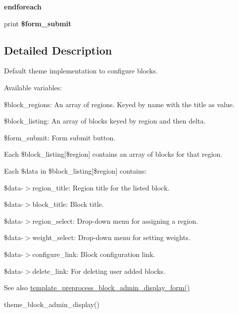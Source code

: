 \begin{DoxyCompactItemize}
\item 
\hypertarget{block-admin-display-form_8tpl_8php_a672d9707ef91db026c210f98cc601123}{
{\bfseries endforeach}}
\label{block-admin-display-form_8tpl_8php_a672d9707ef91db026c210f98cc601123}

\item 
\hypertarget{block-admin-display-form_8tpl_8php_a781a0b4540f3c04b33978b845353b2ab}{
print {\bfseries \$form\_\-submit}}
\label{block-admin-display-form_8tpl_8php_a781a0b4540f3c04b33978b845353b2ab}

\end{DoxyCompactItemize}


\subsection{Detailed Description}
Default theme implementation to configure blocks.

Available variables:
\begin{DoxyItemize}
\item \$block\_\-regions: An array of regions. Keyed by name with the title as value.
\item \$block\_\-listing: An array of blocks keyed by region and then delta.
\item \$form\_\-submit: Form submit button.
\end{DoxyItemize}

Each \$block\_\-listing\mbox{[}\$region\mbox{]} contains an array of blocks for that region.

Each \$data in \$block\_\-listing\mbox{[}\$region\mbox{]} contains:
\begin{DoxyItemize}
\item \$data-\/$>$region\_\-title: Region title for the listed block.
\item \$data-\/$>$block\_\-title: Block title.
\item \$data-\/$>$region\_\-select: Drop-\/down menu for assigning a region.
\item \$data-\/$>$weight\_\-select: Drop-\/down menu for setting weights.
\item \$data-\/$>$configure\_\-link: Block configuration link.
\item \$data-\/$>$delete\_\-link: For deleting user added blocks.
\end{DoxyItemize}

\begin{DoxySeeAlso}{See also}
\hyperlink{block_8admin_8inc_a790da1d1c8cea6bceca5374a4e410c01}{template\_\-preprocess\_\-block\_\-admin\_\-display\_\-form()} 

theme\_\-block\_\-admin\_\-display() 
\end{DoxySeeAlso}
